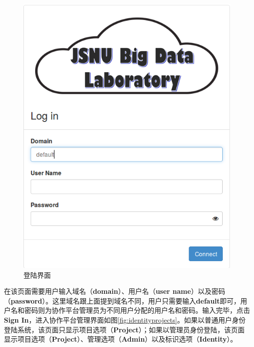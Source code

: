 \documentclass[12pt]{ctexart}%
\begin{document}
\begin{figure}[!htb]
\centering
\includegraphics[width=5in]{./figures/login}
\caption{登陆界面}
\label{fig:login}
\end{figure}
在该页面需要用户输入域名（\textbf{domain}）、用户名（\textbf{user name}）以及密码（\textbf{password}）。这里域名跟上面提到域名不同，用户只需要输入\textbf{default}即可，用户名和密码则为协作平台管理员为不同用户分配的用户名和密码。输入完毕，点击\textbf{Sign In}，进入协作平台管理界面如图\ref{fig:identityprojects}。如果以普通用户身份登陆系统，该页面只显示项目选项（\textbf{Project}）；如果以管理员身份登陆，该页面显示项目选项（\textbf{Project}）、管理选项（\textbf{Admin}）以及标识选项（\textbf{Identity}）。
\end{document}
